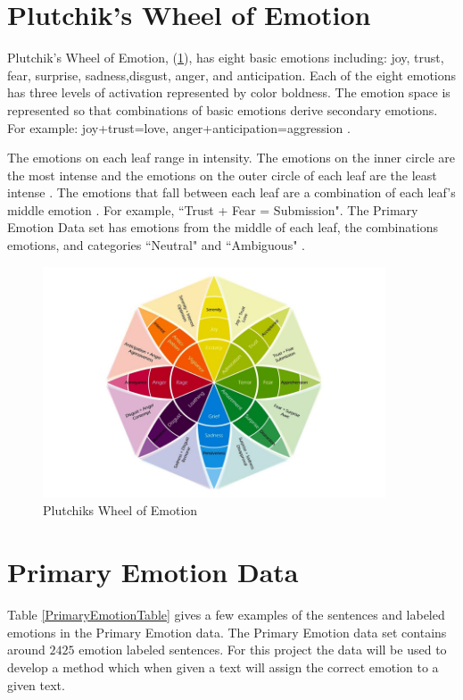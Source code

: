 \documentclass[titlepage,letterpaper]{article}
\begin{document}
\section{Plutchik's Wheel of Emotion}

Plutchik's Wheel of Emotion, (\cref{plutchikemotionwheel}), has eight basic emotions including: joy, trust, fear, surprise, sadness,disgust, anger, and anticipation. Each of the eight emotions has three levels of activation represented by color boldness. The emotion space is represented so that combinations of basic emotions derive secondary emotions. For example: joy+trust=love, anger+anticipation=aggression \cite{plutchik2001nature}.

The emotions on each leaf range in intensity. The emotions on the inner circle are the most intense and the emotions on the outer circle of each leaf are the least intense \cite{WheelofEmotion}. The emotions that fall between each leaf are a combination of each leaf's middle emotion \cite{WheelofEmotion}. For example, ``Trust + Fear = Submission". The Primary Emotion Data set has emotions from the middle of each leaf, the combinations emotions, and categories ``Neutral" and ``Ambiguous" \cite{lowriwilliams}.

\begin{figure}[ht]
	\center
	\includegraphics[width=4in]{PlutchikWheelOfEmotion.jpg}
	\caption{Plutchiks Wheel of Emotion \cite{WheelofEmotion}}
	\label{plutchikemotionwheel}
\end{figure}

\section{Primary Emotion Data}
Table \ref{PrimaryEmotionTable} gives a few examples of the sentences and labeled emotions in the Primary Emotion data. The Primary Emotion data set contains around $2425$ emotion labeled sentences. For this project the data will be used to develop a method which when given a text will assign the correct emotion to a given text. 
 
\end{document}
